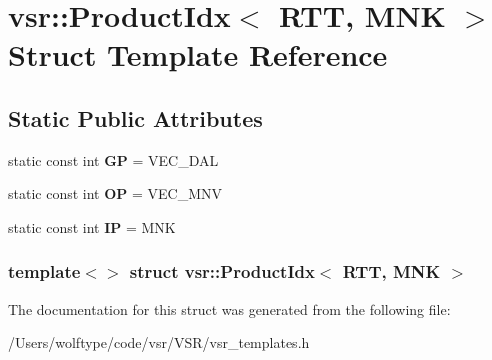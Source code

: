 \hypertarget{structvsr_1_1_product_idx_3_01_r_t_t_00_01_m_n_k_01_4}{\section{vsr\-:\-:Product\-Idx$<$ R\-T\-T, M\-N\-K $>$ Struct Template Reference}
\label{structvsr_1_1_product_idx_3_01_r_t_t_00_01_m_n_k_01_4}
}
\subsection*{Static Public Attributes}
\begin{DoxyCompactItemize}
\item 
\hypertarget{structvsr_1_1_product_idx_3_01_r_t_t_00_01_m_n_k_01_4_a125de861d7024b01b3ee60f8673da32f}{static const int {\bfseries G\-P} = V\-E\-C\-\_\-\-D\-A\-L}\label{structvsr_1_1_product_idx_3_01_r_t_t_00_01_m_n_k_01_4_a125de861d7024b01b3ee60f8673da32f}

\item 
\hypertarget{structvsr_1_1_product_idx_3_01_r_t_t_00_01_m_n_k_01_4_a0e267fe9fa0f403c4fac344105d5c1e9}{static const int {\bfseries O\-P} = V\-E\-C\-\_\-\-M\-N\-V}\label{structvsr_1_1_product_idx_3_01_r_t_t_00_01_m_n_k_01_4_a0e267fe9fa0f403c4fac344105d5c1e9}

\item 
\hypertarget{structvsr_1_1_product_idx_3_01_r_t_t_00_01_m_n_k_01_4_a486cc5af1caf66bae8c09b04f2f7d16b}{static const int {\bfseries I\-P} = M\-N\-K}\label{structvsr_1_1_product_idx_3_01_r_t_t_00_01_m_n_k_01_4_a486cc5af1caf66bae8c09b04f2f7d16b}

\end{DoxyCompactItemize}
\subsubsection*{template$<$$>$ struct vsr\-::\-Product\-Idx$<$ R\-T\-T, M\-N\-K $>$}



The documentation for this struct was generated from the following file\-:\begin{DoxyCompactItemize}
\item 
/\-Users/wolftype/code/vsr/\-V\-S\-R/vsr\-\_\-templates.\-h\end{DoxyCompactItemize}

